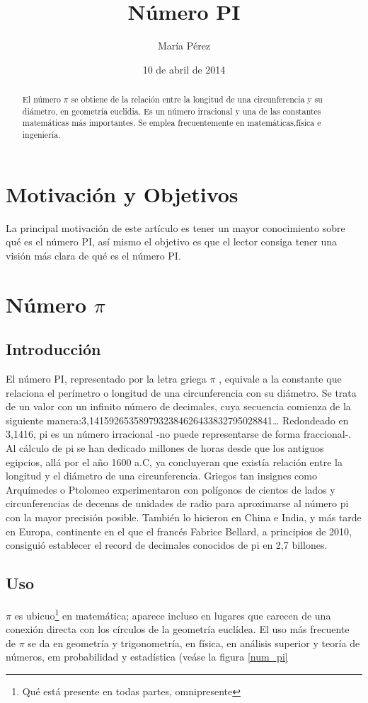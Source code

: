 \documentclass[a4paper,12pt]{article}
\title{Número PI}
\author{María Pérez}
\date{10 de abril de 2014}
\newcommand{\PI}{{$\pi$ }}
\begin{document}
\maketitle

\begin{abstract}
El número \PI se obtiene de la relación entre la longitud de una circunferencia y su diámetro, en geometría euclidia. Es un número irracional y una de las constantes matemáticas más importantes. Se emplea frecuentemente en matemáticas,física e ingeniería.
\cite{wikipedia}
\end{abstract}

\section{Motivación y Objetivos}
La principal motivación de este artículo es tener un mayor conocimiento sobre qué es el número PI, así mismo el objetivo es que el lector consiga tener una visión más clara de qué es el número PI.

\section{Número \PI}
\subsection{Introducción}
El número PI, representado por la letra griega \PI, equivale a la constante que relaciona el perímetro o longitud de una circunferencia con su diámetro. Se trata de un valor con un infinito número de decimales, cuya secuencia comienza de la siguiente manera:3,1415926535897932384626433832795028841…
Redondeado en 3,1416, pi es un número irracional -no puede representarse de forma fraccional-.
Al cálculo de pi se han dedicado millones de horas desde que los antiguos egipcios, allá por el año 1600 a.C, ya concluyeran que existía relación entre la longitud y el diámetro de una circunferencia.
Griegos tan insignes como Arquímedes o Ptolomeo experimentaron con polígonos de cientos de lados y circunferencias de decenas de unidades de radio para aproximarse al número pi con la mayor precisión posible. También lo hicieron en China e India, y más tarde en Europa, continente en el que el francés Fabrice Bellard, a principios de 2010, consiguió establecer el record de decimales conocidos de pi en 2,7 billones.
\subsection{Uso}
\PI es ubicuo\footnote{Qué está presente en todas partes, omnipresente} en matemática; aparece incluso en lugares que carecen de una conexión directa con los círculos de la geometría euclídea.
El uso más frecuente de \PI se da en geometría y trigonometría, en física, en análisis superior y teoría de números, em probabilidad y estadística (veáse la figura \ref{num_pi}
\end{document}
